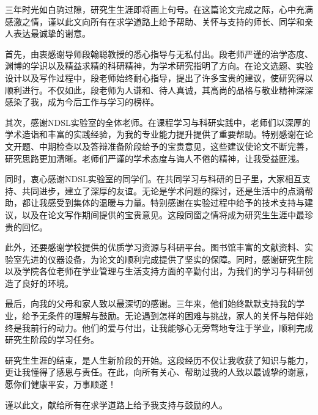 
\thesisacknowledgement

三年时光如白驹过隙，研究生生涯即将画上句号。在这篇论文完成之际，心中充满感激之情，谨以此文向所有在求学道路上给予帮助、关怀与支持的师长、同学和亲人表达最诚挚的谢意。

首先，由衷感谢导师段翰聪教授的悉心指导与无私付出。段老师严谨的治学态度、渊博的学识以及精益求精的科研精神，为学术研究指明了方向。在论文选题、实验设计以及写作过程中，段老师始终耐心指导，提出了许多宝贵的建议，使研究得以顺利进行。不仅如此，段老师为人谦和、待人真诚，其高尚的品格与敬业精神深深感染了我，成为今后工作与学习的榜样。

其次，感谢NDSL实验室的全体老师。在课程学习与科研实践中，老师们以深厚的学术造诣和丰富的实践经验，为我的专业能力提升提供了重要帮助。特别感谢在论文开题、中期检查以及答辩准备阶段给予的宝贵意见，这些建议使论文不断完善，研究思路更加清晰。老师们严谨的学术态度与诲人不倦的精神，让我受益匪浅。

同时，衷心感谢NDSL实验室的同学们。在共同学习与科研的日子里，大家相互支持、共同进步，建立了深厚的友谊。无论是学术问题的探讨，还是生活中的点滴帮助，都让我感受到集体的温暖与力量。特别感谢在实验过程中给予的技术支持与建议，以及在论文写作期间提供的宝贵意见。这段同窗之情将成为研究生生涯中最珍贵的回忆。

此外，还要感谢学校提供的优质学习资源与科研平台。图书馆丰富的文献资料、实验室先进的仪器设备，为论文的顺利完成提供了坚实的保障。同时，感谢研究生院以及学院各位老师在学业管理与生活支持方面的辛勤付出，为我们的学习与科研创造了良好的环境。

最后，向我的父母和家人致以最深切的感谢。三年来，他们始终默默支持我的学业，给予无条件的理解与鼓励。无论遇到怎样的困难与挑战，家人的关怀与陪伴始终是我前行的动力。他们的爱与付出，让我能够心无旁骛地专注于学业，顺利完成研究生阶段的学习任务。

研究生生涯的结束，是人生新阶段的开始。这段经历不仅让我收获了知识与能力，更让我懂得了感恩与责任。在此，向所有关心、帮助过我的人致以最诚挚的谢意，愿你们健康平安，万事顺遂！

谨以此文，献给所有在求学道路上给予我支持与鼓励的人。